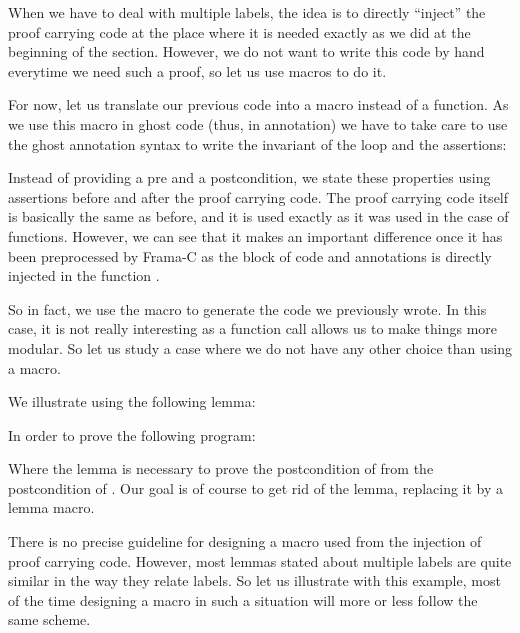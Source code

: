 When we have to deal with multiple labels, the idea is to directly ``inject''
the proof carrying code at the place where it is needed exactly as we did at the
beginning of the section. However, we do not want to write this code by hand
everytime we need such a proof, so let us use macros to do it.



For now, let us translate our previous code into a macro instead of a function.
As we use this macro in ghost code (thus, in annotation) we have to take care to
use the ghost annotation syntax to write the invariant of the loop and the
assertions:






Instead of providing a pre and a postcondition, we state these properties using
assertions before and after the proof carrying code. The proof carrying code
itself is basically the same as before, and it is used exactly as it was used in
the case of functions. However, we can see that it makes an important difference
once it has been preprocessed by Frama-C as the block of code and annotations is
directly injected in the function .






So in fact, we use the macro to generate the code we previously wrote. In this
case, it is not really interesting as a function call allows us to make things
more modular. So let us study a case where we do not have any other choice than
using a macro.



We illustrate using the following lemma:





In order to prove the following program:




Where the lemma  is necessary to prove the postcondition
of  from the postcondition of . Our
goal is of course to get rid of the lemma, replacing it by a lemma macro.



There is no precise guideline for designing a macro used from the injection of
proof carrying code. However, most lemmas stated about multiple labels are quite
similar in the way they relate labels. So let us illustrate with this example,
most of the time designing a macro in such a situation will more or less follow
the same scheme.



